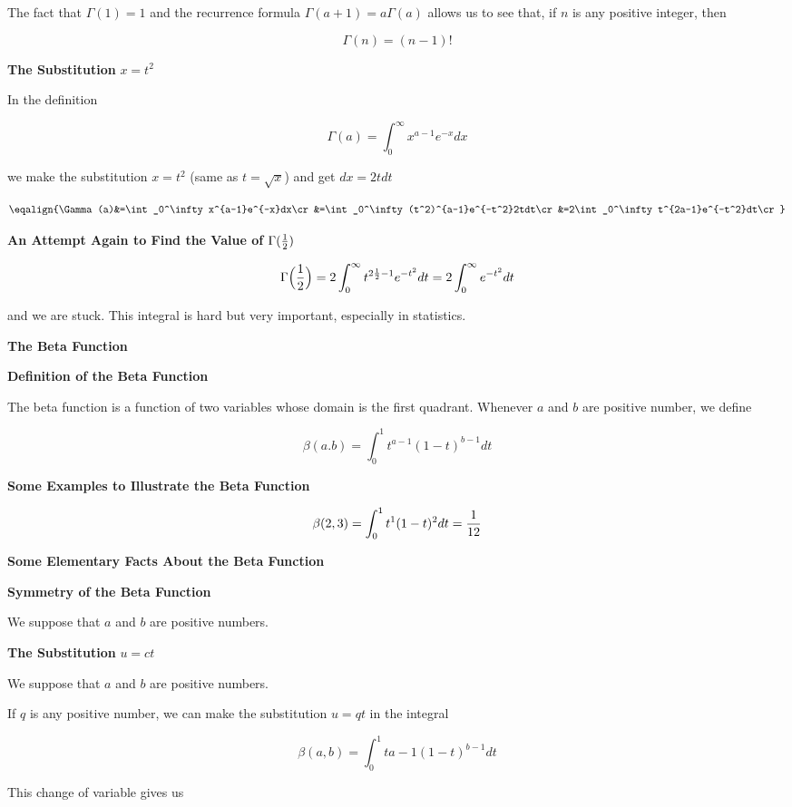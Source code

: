 \vskip 1mm
The fact that $\Gamma(1)=1$ and the recurrence formula $\Gamma(a+1)=a\Gamma(a)$ allows us to see that, if $n$ is any positive integer, then

$$\Gamma(n)=(n-1)!$$

\filbreak
\vskip 1cm
{\bf The Substitution} $x=t^2$

\vskip 1mm
In the definition

$$\Gamma(a)=\int_0^\infty x^{a-1}e^{-x}dx$$

we make the substitution $x=t^2$ (same as $t=\sqrt{x}$) and get $dx=2tdt$

$$\eqalign{\Gamma(a)&=\int_0^\infty x^{a-1}e^{-x}dx\cr
		&=\int_0^\infty(t^2)^{a-1}e^{-t^2}2tdt\cr
		&=2\int_0^\infty t^{2a-1}e^{-t^2}dt\cr}$$


\filbreak
\vskip 1cm
{\bf An Attempt Again to Find the Value of $\Gamma({1\over 2})$}

$$\Gamma\Bigl({1\over 2}\Bigr)=2\int_0^\infty t^{2{1\over 2}-1}e^{-t^2}dt=2\int_0^\infty e^{-t^2}dt$$

and we are stuck. This integral is hard but very important, especially in statistics.

\filbreak
\vskip 1cm
{\bf The Beta Function}

\vskip 1mm
{\bf Definition of the Beta Function}

\vskip 1mm
The beta function is a function of two variables whose domain is the first quadrant. Whenever $a$ and $b$ are positive number, we define

$$\beta(a.b)=\int_0^1t^{a-1}(1-t)^{b-1}dt$$

\filbreak
\vskip 1mm
{\bf Some Examples to Illustrate the Beta Function}

$$\beta(2,3)=\int_0^1t^1(1-t)^2dt={1\over 12}$$

\filbreak
\vskip 1cm
{\bf Some Elementary Facts About the Beta Function}

\vskip 1mm
{\bf Symmetry of the Beta Function}

\vskip 1mm
We suppose that $a$ and $b$ are positive numbers.

\filbreak
\vskip 1mm
{\bf The Substitution} $u=ct$

\vskip 1mm
We suppose that $a$ and $b$ are positive numbers.

\vskip 1mm
If $q$ is any positive number, we can make the substitution $u=qt$ in the integral

$$\beta(a,b)=\int_0^1t{a-1}(1-t)^{b-1}dt$$

This change of variable gives us

